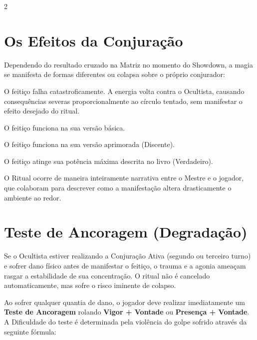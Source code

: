 \documentclass[a4paper,11pt,openany]{book}
\begin{document}
\begin{multicols}{2}

\section{Os Efeitos da Conjuração}

Dependendo do resultado cruzado na Matriz no momento do Showdown, a magia se manifesta de formas diferentes ou colapsa sobre o próprio conjurador:

\begin{description}[font=\sffamily\bfseries\color{CodexRed}]
    
    \item[Ruptura:] O feitiço falha catastroficamente. A energia volta contra o Ocultista, causando consequências severas proporcionalmente ao círculo tentado, sem manifestar o efeito desejado do ritual.
    
    \item[Padrão:] O feitiço funciona na sua versão básica.
    
    \item[Discente:] O feitiço funciona na sua versão aprimorada (Discente).
    
    \item[Verdadeiro:] O feitiço atinge sua potência máxima descrita no livro (Verdadeiro).
    
    \item[Anomalia:] O Ritual ocorre de maneira inteiramente narrativa entre o Mestre e o jogador, que colaboram para descrever como a manifestação altera drasticamente o ambiente ao redor.
    
\end{description}

\section{Teste de Ancoragem (Degradação)}

Se o Ocultista estiver realizando a Conjuração Ativa (segundo ou terceiro turno) e sofrer dano físico antes de manifestar o feitiço, o trauma e a agonia ameaçam rasgar a estabilidade de sua concentração. O ritual não é cancelado automaticamente, mas sofre o risco iminente de colapso.

Ao sofrer qualquer quantia de dano, o jogador deve realizar imediatamente um \textbf{Teste de Ancoragem} rolando \textbf{Vigor + Vontade} ou \textbf{Presença + Vontade}. A Dificuldade do teste é determinada pela violência do golpe sofrido através da seguinte fórmula:


\end{multicols}
\end{document}
